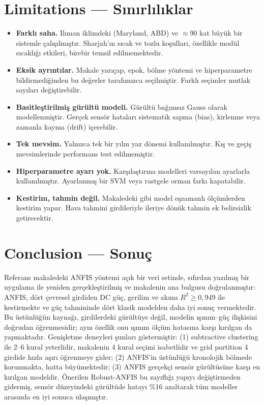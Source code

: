 \documentclass[11pt,a4paper]{article}
\begin{document}
\section{Limitations — Sınırlılıklar}
\begin{itemize}
\item \textbf{Farklı saha.} Ilıman iklimdeki (Maryland, ABD) ve $\approx$90 kat büyük bir sistemle çalışılmıştır. Sharjah'ın sıcak ve tozlu koşulları, özellikle modül sıcaklığı etkileri, birebir temsil edilmemektedir.
\item \textbf{Eksik ayrıntılar.} Makale yarıçap, epok, bölme yöntemi ve hiperparametre bildirmediğinden bu değerler tarafımızca seçilmiştir. Farklı seçimler mutlak sayıları değiştirebilir.
\item \textbf{Basitleştirilmiş gürültü modeli.} Gürültü bağımsız Gauss olarak modellenmiştir. Gerçek sensör hataları sistematik sapma (bias), kirlenme veya zamanla kayma (drift) içerebilir.
\item \textbf{Tek mevsim.} Yalnızca tek bir yılın yaz dönemi kullanılmıştır. Kış ve geçiş mevsimlerinde performans test edilmemiştir.
\item \textbf{Hiperparametre ayarı yok.} Karşılaştırma modelleri varsayılan ayarlarla kullanılmıştır. Ayarlanmış bir SVM veya rastgele orman farkı kapatabilir.
\item \textbf{Kestirim, tahmin değil.} Makaledeki gibi model eşzamanlı ölçümlerden kestirim yapar. Hava tahmini girdileriyle ileriye dönük tahmin ek belirsizlik getirecektir.
\end{itemize}

\section{Conclusion — Sonuç}
Referans makaledeki ANFIS yöntemi açık bir veri setinde, sıfırdan yazılmış bir uygulama ile yeniden gerçekleştirilmiş ve makalenin ana bulgusu doğrulanmıştır: ANFIS, dört çevresel girdiden DC güç, gerilim ve akımı $R^2\geq0{,}949$ ile kestirmekte ve güç tahmininde dört klasik modelden daha iyi sonuç vermektedir. Bu üstünlüğün kaynağı, girdilerdeki gürültüye değil, modelin ışınım–güç ilişkisini doğrudan öğrenmesidir; aynı özellik onu ışınım ölçüm hatasına karşı kırılgan da yapmaktadır. Genişletme deneyleri şunları göstermiştir: (1) subtractive clustering ile 2–6 kural yeterlidir, makalenin 4 kural seçimi isabetlidir ve grid partition 4 girdide hızla aşırı öğrenmeye gider; (2) ANFIS'in üstünlüğü kronolojik bölmede korunmakta, hatta büyümektedir; (3) ANFIS gerçekçi sensör gürültüsüne karşı en kırılgan modeldir. Önerilen Robust-ANFIS bu zayıflığı yapıyı değiştirmeden gidermiş, sensör düzeyindeki gürültüde hatayı \%16 azaltarak tüm modeller arasında en iyi sonuca ulaşmıştır.
\end{document}

